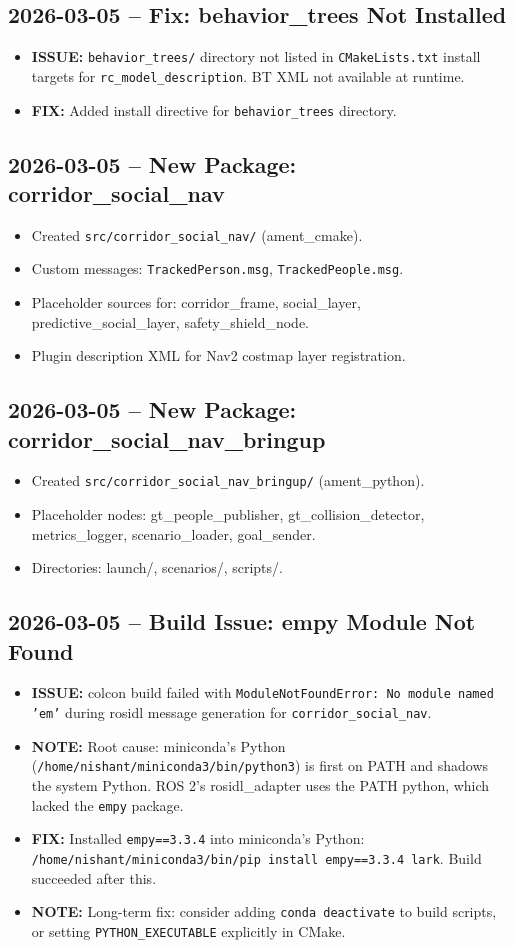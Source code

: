 \documentclass[11pt]{article}
\newcommand{\logentry}[1]{\subsection*{#1}}
\newcommand{\issue}[1]{\textcolor{issuered}{\textbf{ISSUE:} #1}}
\newcommand{\fix}[1]{\textcolor{fixgreen}{\textbf{FIX:} #1}}
\newcommand{\note}[1]{\textcolor{notblue}{\textbf{NOTE:} #1}}
\begin{document}
\logentry{2026-03-05 -- Fix: behavior\_trees Not Installed}
\begin{itemize}
  \item \issue{\texttt{behavior\_trees/} directory not listed in \texttt{CMakeLists.txt} install targets for \texttt{rc\_model\_description}. BT XML not available at runtime.}
  \item \fix{Added install directive for \texttt{behavior\_trees} directory.}
\end{itemize}

\logentry{2026-03-05 -- New Package: corridor\_social\_nav}
\begin{itemize}
  \item Created \texttt{src/corridor\_social\_nav/} (ament\_cmake).
  \item Custom messages: \texttt{TrackedPerson.msg}, \texttt{TrackedPeople.msg}.
  \item Placeholder sources for: corridor\_frame, social\_layer, predictive\_social\_layer, safety\_shield\_node.
  \item Plugin description XML for Nav2 costmap layer registration.
\end{itemize}

\logentry{2026-03-05 -- New Package: corridor\_social\_nav\_bringup}
\begin{itemize}
  \item Created \texttt{src/corridor\_social\_nav\_bringup/} (ament\_python).
  \item Placeholder nodes: gt\_people\_publisher, gt\_collision\_detector, metrics\_logger, scenario\_loader, goal\_sender.
  \item Directories: launch/, scenarios/, scripts/.
\end{itemize}

\logentry{2026-03-05 -- Build Issue: empy Module Not Found}
\begin{itemize}
  \item \issue{colcon build failed with \texttt{ModuleNotFoundError: No module named 'em'} during rosidl message generation for \texttt{corridor\_social\_nav}.}
  \item \note{Root cause: miniconda's Python (\texttt{/home/nishant/miniconda3/bin/python3}) is first on PATH and shadows the system Python. ROS 2's rosidl\_adapter uses the PATH python, which lacked the \texttt{empy} package.}
  \item \fix{Installed \texttt{empy==3.3.4} into miniconda's Python: \texttt{/home/nishant/miniconda3/bin/pip install empy==3.3.4 lark}. Build succeeded after this.}
  \item \note{Long-term fix: consider adding \texttt{conda deactivate} to build scripts, or setting \texttt{PYTHON\_EXECUTABLE} explicitly in CMake.}
\end{itemize}
\end{document}

